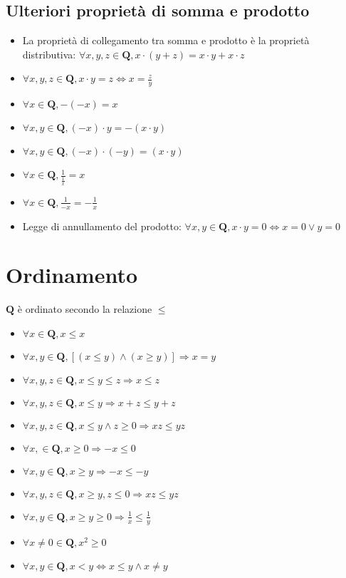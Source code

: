 \subsection{Ulteriori propriet\`a di somma e prodotto}
\begin{itemize}
\item La propriet\`a di collegamento tra somma e prodotto \`e la propriet\`a distributiva: $\forall x, y, z \in \mathbf{Q}, x\cdot(y + z)=x\cdot y+x\cdot z$
\item $\forall x, y, z \in \mathbf{Q}, x\cdot y=z \Leftrightarrow x=\frac{z}{y}$
\item $\forall x \in \mathbf{Q}, -(-x)=x$
\item $\forall x, y \in \mathbf{Q}, (-x)\cdot y=-(x \cdot y)$
\item $\forall x, y \in \mathbf{Q}, (-x)\cdot (-y)=(x \cdot y)$
\item $\forall x \in \mathbf{Q}, \frac{1}{\frac{1}{x}}=x$
\item $\forall x \in \mathbf{Q}, \frac{1}{-x}=-\frac{1}{x}$
\item Legge di annullamento del prodotto: $\forall x, y \in \mathbf{Q}, x\cdot y=0 \Leftrightarrow x=0 \lor y=0 $
\end{itemize}
\section{Ordinamento}
$\mathbf{Q}$ \`e ordinato secondo la relazione $\le$
\begin{itemize}
\item $\forall x\in \mathbf{Q}, x\le x$
\item $\forall x, y\in \mathbf{Q},[(x\le y)\wedge(x\ge y)] \Rightarrow x=y$
\item $\forall x, y, z\in \mathbf{Q}, x\le y\le z \Rightarrow x\le z$
\item $\forall x, y, z \in \mathbf{Q}, x\le y \Rightarrow x+z\le y+z$
\item $\forall x, y, z \in \mathbf{Q}, x\le y \wedge z\ge 0 \Rightarrow xz\le yz$
\item $\forall x, \in \mathbf{Q}, x\ge 0 \Rightarrow -x\le 0$
\item $\forall x, y\in \mathbf{Q}, x\ge y \Rightarrow -x\le -y$
\item $\forall x, y, z \in \mathbf{Q},x\ge y, z\le 0 \Rightarrow xz\le yz$
\item $\forall x, y \in \mathbf{Q}, x\ge y \ge 0 \Rightarrow \frac{1}{x}\le\frac{1}{y}$
\item $\forall x\ne 0 \in \mathbf{Q}, x^2\ge 0$
\item $\forall x, y \in \mathbf{Q}, x<y \Leftrightarrow x \le y \wedge x\ne y$
\end{itemize}
